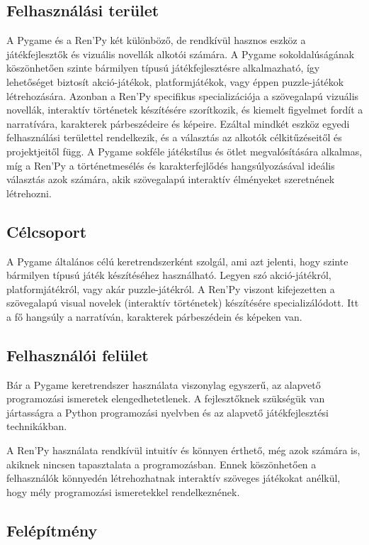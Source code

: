 \subsection{Felhasználási terület}
 A Pygame és a Ren'Py két különböző, de rendkívül hasznos eszköz a játékfejlesztők és vizuális novellák alkotói számára. A Pygame sokoldalúságának köszönhetően szinte bármilyen típusú játékfejlesztésre alkalmazható, így lehetőséget biztosít akció-játékok, platformjátékok, vagy éppen puzzle-játékok létrehozására. Azonban a Ren'Py specifikus specializációja a szövegalapú vizuális novellák, interaktív történetek készítésére szorítkozik, és kiemelt figyelmet fordít a narratívára, karakterek párbeszédeire és képeire. Ezáltal mindkét eszköz egyedi felhasználási területtel rendelkezik, és a választás az alkotók célkitűzéseitől és projektjeitől függ. A Pygame sokféle játékstílus és ötlet megvalósítására alkalmas, míg a Ren'Py a történetmesélés és karakterfejlődés hangsúlyozásával ideális választás azok számára, akik szövegalapú interaktív élményeket szeretnének létrehozni.

\subsection{Célcsoport}

 A Pygame általános célú keretrendszerként szolgál, ami azt jelenti, hogy szinte bármilyen típusú játék készítéséhez használható. Legyen szó akció-játékról, platformjátékról, vagy akár puzzle-játékról.
A Ren'Py viszont kifejezetten a szövegalapú visual novelek (interaktív történetek) készítésére specializálódott. Itt a fő hangsúly a narratíván, karakterek párbeszédein és képeken van.

\subsection{Felhasználói felület}

 Bár a Pygame keretrendszer használata viszonylag egyszerű, az alapvető programozási ismeretek elengedhetetlenek. A fejlesztőknek szükségük van jártasságra a Python programozási nyelvben és az alapvető játékfejlesztési technikákban.

A Ren'Py használata rendkívül intuitív és könnyen érthető, még azok számára is, akiknek nincsen tapasztalata a programozásban. Ennek köszönhetően a felhasználók könnyedén létrehozhatnak interaktív szöveges játékokat anélkül, hogy mély programozási ismeretekkel rendelkeznének.
\subsection{Felépítmény}

